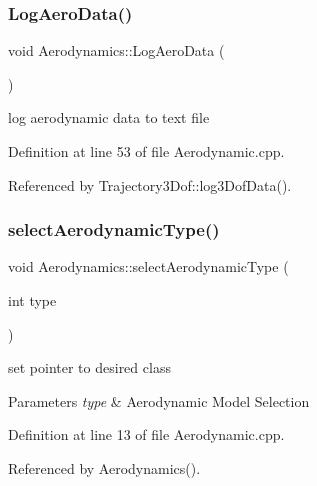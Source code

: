 \subsubsection{\texorpdfstring{Log\+Aero\+Data()}{LogAeroData()}}
{\footnotesize\ttfamily void Aerodynamics\+::\+Log\+Aero\+Data (\begin{DoxyParamCaption}{ }\end{DoxyParamCaption})}



log aerodynamic data to text file 



Definition at line 53 of file Aerodynamic.\+cpp.



Referenced by Trajectory3\+Dof\+::log3\+Dof\+Data().

\mbox{\label{class_aerodynamics_a9aa3397e8b1d91ed237146a57bbe6bcf}} 
\subsubsection{\texorpdfstring{select\+Aerodynamic\+Type()}{selectAerodynamicType()}}
{\footnotesize\ttfamily void Aerodynamics\+::select\+Aerodynamic\+Type (\begin{DoxyParamCaption}\item[{int}]{type }\end{DoxyParamCaption})}



set pointer to desired class 


\begin{DoxyParams}{Parameters}
{\em type} & Aerodynamic Model Selection \\
\hline
\end{DoxyParams}


Definition at line 13 of file Aerodynamic.\+cpp.



Referenced by Aerodynamics().

\mbox{\label{class_aerodynamics_a83f9967d09e40e6c53dd17815f6bb096}} 

